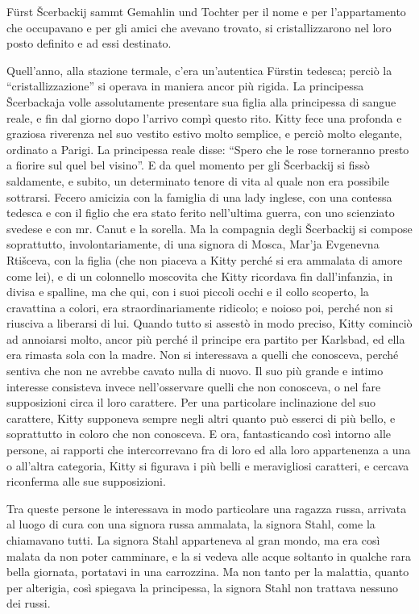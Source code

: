 Fürst Šcerbackij sammt Gemahlin und Tochter per il nome e per l'appartamento che occupavano e per gli amici che avevano trovato, si cristallizzarono nel loro posto definito e ad essi destinato. 

Quell'anno, alla stazione termale, c'era un'autentica Fürstin tedesca; perciò la ``cristallizzazione'' si operava in maniera ancor più rigida. La principessa Šcerbackaja volle assolutamente presentare sua figlia alla principessa di sangue reale, e fin dal giorno dopo l'arrivo compì questo rito. Kitty fece una profonda e graziosa riverenza nel suo vestito estivo molto semplice, e perciò molto elegante, ordinato a Parigi. La principessa reale disse: ``Spero che le rose torneranno presto a fiorire sul quel bel visino''. E da quel momento per gli Šcerbackij si fissò saldamente, e subito, un determinato tenore di vita al quale non era possibile sottrarsi. Fecero amicizia con la famiglia di una lady inglese, con una contessa tedesca e con il figlio che era stato ferito nell'ultima guerra, con uno scienziato svedese e con mr. Canut e la sorella. Ma la compagnia degli Šcerbackij si compose soprattutto, involontariamente, di una signora di Mosca, Mar'ja Evgenevna Rtišceva, con la figlia (che non piaceva a Kitty perché si era ammalata di amore come lei), e di un colonnello moscovita che Kitty ricordava fin dall'infanzia, in divisa e spalline, ma che qui, con i suoi piccoli occhi e il collo scoperto, la cravattina a colori, era straordinariamente ridicolo; e noioso poi, perché non si riusciva a liberarsi di lui. Quando tutto si assestò in modo preciso, Kitty cominciò ad annoiarsi molto, ancor più perché il principe era partito per Karlsbad, ed ella era rimasta sola con la madre. Non si interessava a quelli che conosceva, perché sentiva che non ne avrebbe cavato nulla di nuovo. Il suo più grande e intimo interesse consisteva invece nell'osservare quelli che non conosceva, o nel fare supposizioni circa il loro carattere. Per una particolare inclinazione del suo carattere, Kitty supponeva sempre negli altri quanto può esserci di più bello, e soprattutto in coloro che non conosceva. E ora, fantasticando così intorno alle persone, ai rapporti che intercorrevano fra di loro ed alla loro appartenenza a una o all'altra categoria, Kitty si figurava i più belli e meravigliosi caratteri, e cercava riconferma alle sue supposizioni. 

Tra queste persone le interessava in modo particolare una ragazza russa, arrivata al luogo di cura con una signora russa ammalata, la signora Stahl, come la chiamavano tutti. La signora Stahl apparteneva al gran mondo, ma era così malata da non poter camminare, e la si vedeva alle acque soltanto in qualche rara bella giornata, portatavi in una carrozzina. Ma non tanto per la malattia, quanto per alterigia, così spiegava la principessa, la signora Stahl non trattava nessuno dei russi. 

